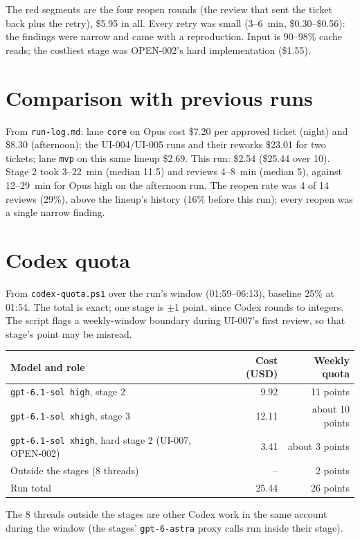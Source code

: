 \documentclass[11pt,a4paper]{article}
\begin{document}
The red segments are the four reopen rounds (the review that sent the ticket back plus the
retry), \$5.95 in all. Every retry was small (3--6~min, \$0.30--\$0.56): the findings were
narrow and came with a reproduction. Input is 90--98\% cache reads; the costliest stage was
OPEN-002's hard implementation (\$1.55).

\section*{Comparison with previous runs}

From \texttt{run-log.md}: lane \texttt{core} on Opus cost \$7.20 per approved ticket (night) and
\$8.30 (afternoon); the UI-004/UI-005 runs and their reworks \$23.01 for two tickets; lane
\texttt{mvp} on this same lineup \$2.69. This run: \$2.54 (\$25.44 over 10). Stage 2 took
3--22~min (median 11.5) and reviews 4--8~min (median 5), against 12--29~min for Opus high on
the afternoon run. The reopen rate was 4 of 14 reviews (29\%), above the lineup's history
(16\% before this run); every reopen was a single narrow finding.

\section*{Codex quota}

From \texttt{codex-quota.ps1} over the run's window (01:59--06:13), baseline 25\% at 01:54.
The total is exact; one stage is $\pm$1 point, since Codex rounds to integers. The script
flags a weekly-window boundary during UI-007's first review, so that stage's point may be
misread.

\begin{center}
\begin{tabular}{@{}lrr@{}}
\toprule
Model and role & Cost (USD) & Weekly quota \\
\midrule
\texttt{gpt-6.1-sol high}, stage 2 & 9.92 & 11 points \\
\texttt{gpt-6.1-sol xhigh}, stage 3 & 12.11 & about 10 points \\
\texttt{gpt-6.1-sol xhigh}, hard stage 2 (UI-007, OPEN-002) & 3.41 & about 3 points \\
Outside the stages (8 threads) & -- & 2 points \\
\midrule
Run total & 25.44 & 26 points \\
\bottomrule
\end{tabular}
\end{center}

The 8 threads outside the stages are other Codex work in the same account during the window
(the stages' \texttt{gpt-6-astra} proxy calls run inside their stage).
\end{document}
